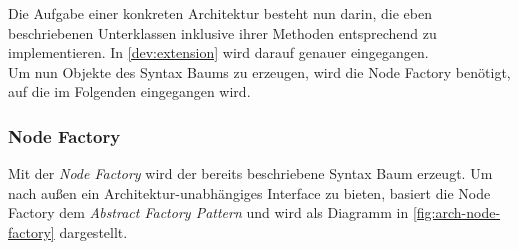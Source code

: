 Die Aufgabe einer konkreten Architektur besteht nun darin, die eben beschriebenen
Unterklassen inklusive ihrer Methoden entsprechend zu implementieren. In
\autoref{dev:extension} wird darauf genauer eingegangen. \\
Um nun Objekte des Syntax Baums zu erzeugen, wird die Node Factory benötigt, auf
die im Folgenden eingegangen wird.

\subsubsection{Node Factory}
\label{module-arch-node-factory}

Mit der \emph{Node Factory} wird der bereits beschriebene Syntax Baum erzeugt.
Um nach außen ein Architektur-unabhängiges Interface zu bieten, basiert die
Node Factory dem \emph{Abstract Factory Pattern} und wird als Diagramm in
\autoref{fig:arch-node-factory} dargestellt.

